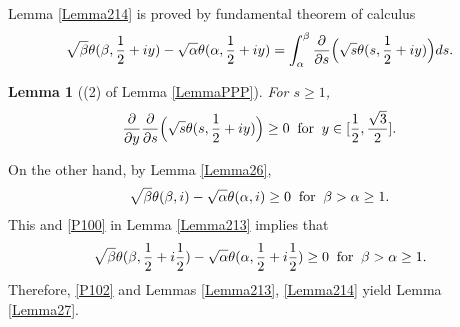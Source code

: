 \documentclass[reqno,english]{amsart}
\newtheorem{lemma}{Lemma}[section]
\newtheorem{open problem}{Open Problem}[section]
\newtheorem{open question}{Open Question}[section]
\newtheorem{open questions on hexagonal lattice}{Open Questions on hexagonal lattice}[section]
\begin{document}
Lemma \ref{Lemma214} is proved by fundamental theorem of calculus
\begin{equation}\aligned\nonumber
\sqrt\beta\theta(\beta,\frac{1}{2}+iy)-\sqrt\alpha\theta(\alpha,\frac{1}{2}+iy)
=\int_\alpha^\beta\frac{\partial}{\partial s}\Big(\sqrt s\theta(s,\frac{1}{2}+iy)\Big)ds.
\endaligned\end{equation}


\begin{lemma}[(2) of Lemma \ref{LemmaPPP}]\label{Lemma215}
For $s\geq1$,
\begin{equation}\aligned\nonumber
\frac{\partial}{\partial y}\frac{\partial}{\partial s}\Big(\sqrt s\theta(s,\frac{1}{2}+iy)\Big)\geq0\;\;\hbox{for}\;\;y\in[\frac{1}{2},\frac{\sqrt3}{2}].
\endaligned\end{equation}

\end{lemma}

On the other hand, by Lemma \ref{Lemma26},
\begin{equation}\aligned\label{P101}
\sqrt\beta\theta(\beta,i)-\sqrt\alpha\theta(\alpha,i)
\geq0\;\;\hbox{for}\;\;\beta>\alpha\geq1.
\endaligned\end{equation}
This and \eqref{P100} in Lemma \ref{Lemma213} implies that
\begin{equation}\aligned\label{P102}
\sqrt\beta\theta(\beta,\frac{1}{2}+i\frac{1}{2})-\sqrt\alpha\theta(\alpha,\frac{1}{2}+i\frac{1}{2})\geq0\;\;\hbox{for}\;\;\beta>\alpha\geq1.
\endaligned\end{equation}
Therefore, \eqref{P102} and Lemmas \ref{Lemma213}, \ref{Lemma214} yield Lemma \ref{Lemma27}.
\end{document}
